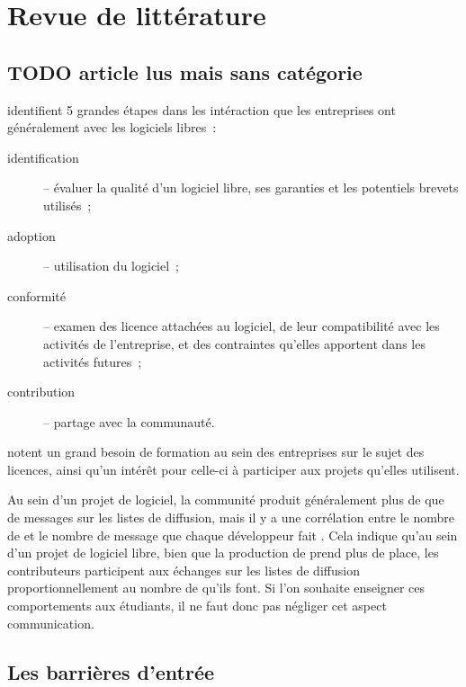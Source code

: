 \chapter{Revue de littérature}

\section{TODO article lus mais sans catégorie}

\textcite{strategies-2012} identifient 5 grandes étapes dans les intéraction que les entreprises ont
généralement avec les logiciels libres :
\begin{description}
    \item[identification] -- évaluer la qualité d'un logiciel libre, ses garanties et les potentiels brevets
        utilisés ;
    \item[adoption] -- utilisation du logiciel ;
    \item[conformité] -- examen des licence attachées au logiciel, de leur compatibilité avec les activités de
        l'entreprise, et des contraintes qu'elles apportent dans les activités futures ;
    \item[contribution] -- partage avec la communauté.
\end{description}

 notent un grand besoin de formation au sein des entreprises sur le sujet des
licences, ainsi qu'un intérêt pour celle-ci à participer aux projets qu'elles utilisent.

Au sein d'un projet de logiciel, la communité produit généralement plus de  que de messages sur
les listes de diffusion, mais il y a une corrélation entre le nombre de  et le nombre de
message que chaque développeur fait . Cela indique qu'au sein d'un
projet de logiciel libre, bien que la production de  prend plus de place, les contributeurs
participent aux échanges sur les listes de diffusion proportionnellement au nombre de  qu'ils
font. Si l'on souhaite enseigner ces comportements aux étudiants, il ne faut donc pas négliger cet aspect
communication.

\section{Les barrières d'entrée}

